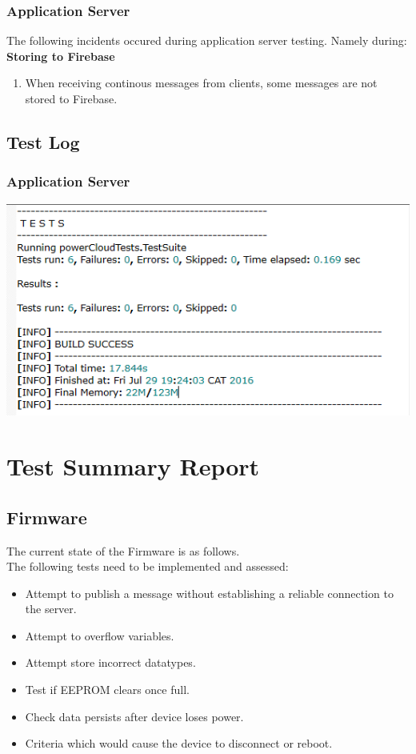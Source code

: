 \documentclass[a4paper,10pt]{article}
\begin{document}
			\subsubsection{Application Server}
			The following incidents occured during application server testing. Namely during:
			\textbf{Storing to Firebase}
				\begin{enumerate}
					\item When receiving continous messages from clients, some messages are not stored to Firebase.
				\end{enumerate}
			
		\subsection{Test Log}
			\subsubsection{Application Server}
					\includegraphics[width=\textwidth]{images/TestOutput.png}
	
	\section{Test Summary Report}
		\subsection{Firmware}
			The current state of the Firmware is as follows.
			\\The following tests need to be implemented and assessed:
			\begin{itemize}
				\item Attempt to publish a message without establishing a reliable connection to the server.
				\item Attempt to overflow variables.
				\item Attempt store incorrect datatypes.
				\item Test if EEPROM clears once full.
				\item Check data persists after device loses power.
				\item Criteria which would cause the device to disconnect or reboot.
			\end{itemize}
\end{document}
